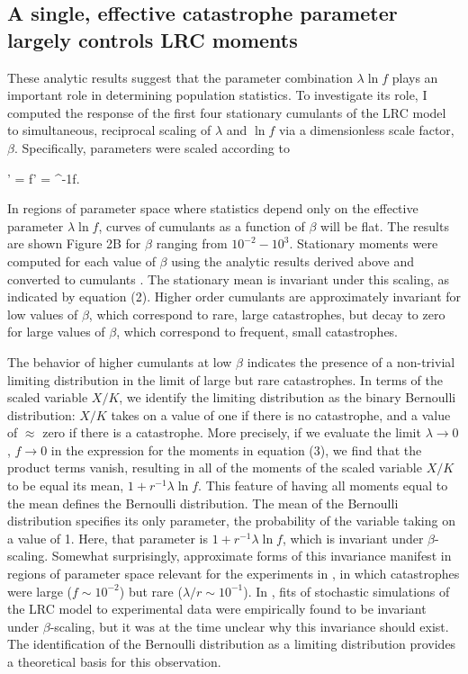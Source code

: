\subsection{A single, effective catastrophe parameter largely controls LRC moments}

These analytic results suggest that the parameter combination $\lambda\ln f$ plays an important role in determining population statistics.  To investigate its role, I computed the response of the first four stationary cumulants of the LRC model to simultaneous, reciprocal scaling of $\lambda$ and $\ln f$ via a dimensionless scale factor, $\beta$.  Specifically, parameters were scaled according to

\be
\lambda' = \beta\lambda \text{,\hspace{1cm}} \ln f' = \beta^{-1}\ln f.
\ee

In regions of parameter space where statistics depend only on the effective parameter $\lambda\ln f$, curves of cumulants as a function of $\beta$ will be flat.  The results are shown Figure 2B for $\beta$ ranging from $10^{-2}-10^3$.  Stationary moments were computed for each value of $\beta$ using the analytic results derived above and converted to cumulants \cite{broca2004cumulant}.  The stationary mean is invariant under this scaling, as indicated by equation (2).  Higher order cumulants are approximately invariant for low values of $\beta$, which correspond to rare, large catastrophes, but decay to zero for large values of $\beta$, which correspond to frequent, small catastrophes.  

The behavior of higher cumulants at low $\beta$ indicates the presence of a non-trivial limiting distribution in the limit of large but rare catastrophes. In terms of the scaled variable $X/K$, we identify the limiting distribution as the binary Bernoulli distribution: $X/K$ takes on a value of one if there is no catastrophe, and a value of $\approx$ zero if there is a catastrophe. More precisely, if we evaluate the limit $\lambda \to 0$, $f \to 0$ in the expression for the moments in equation (3), we find that the product terms vanish, resulting in all of the moments of the scaled variable $X/K$ to be equal its mean, $1+r^{-1}\lambda\ln f$. This feature of having all moments equal to the mean defines the Bernoulli distribution. The mean of the Bernoulli distribution specifies its only parameter, the probability of the variable taking on a value of 1. Here, that parameter is $1+r^{-1}\lambda\ln f$, which is invariant under $\beta$-scaling. Somewhat surprisingly, approximate forms of this invariance manifest in regions of parameter space relevant for the experiments in \cite{wilesPLOS2016}, in which catastrophes were large ($f\sim 10^{-2}$) but rare ($\lambda/r \sim 10^{-1}$). In \cite{wilesPLOS2016}, fits of stochastic simulations of the LRC model to experimental data were empirically found to be invariant under $\beta$-scaling, but it was at the time unclear why this invariance should exist. The identification of the Bernoulli distribution as a limiting distribution provides a theoretical basis for this observation. 

